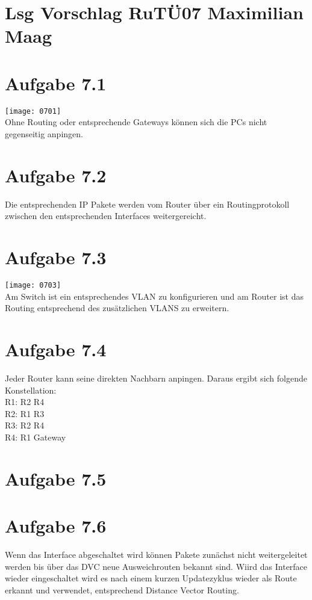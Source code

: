 \documentclass{article}
\begin{document}
	\section*{Lsg Vorschlag RuTÜ07 Maximilian Maag}
	\section*{Aufgabe 7.1}
	\texttt{[image: 0701]} \\
	Ohne Routing oder entsprechende Gateways können sich die PCs nicht gegenseitig anpingen.
	\section*{Aufgabe 7.2}
	Die entsprechenden IP Pakete werden vom Router über ein Routingprotokoll zwischen den entsprechenden Interfaces weitergereicht.
	\section*{Aufgabe 7.3}
	\texttt{[image: 0703]} \\
	Am Switch ist ein entsprechendes VLAN zu konfigurieren und am Router ist das Routing entsprechend des zusätzlichen VLANS zu erweitern.
	\section*{Aufgabe 7.4}
	Jeder Router kann seine direkten Nachbarn anpingen. Daraus ergibt sich folgende Konstellation: \\
	R1: R2 R4 \\
	R2: R1 R3 \\
	R3: R2 R4 \\
	R4: R1 Gateway
	\section*{Aufgabe 7.5}
	
	\section*{Aufgabe 7.6}
	Wenn das Interface abgeschaltet wird können Pakete zunächst nicht weitergeleitet werden bis über das DVC neue Ausweichrouten bekannt sind. Wiird das Interface wieder eingeschaltet wird es nach einem kurzen Updatezyklus wieder als Route erkannt und verwendet, entsprechend Distance Vector Routing.
\end{document}
